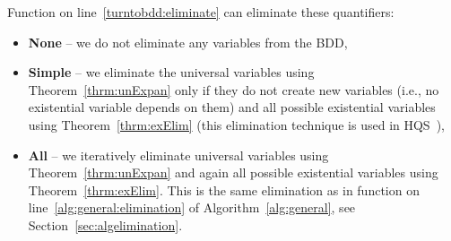 \documentclass[
  digital, %
  color,
  twoside, %
  table,   %
  nolof,     %
  nolot,     %
]{fithesis3}
\theoremstyle{definition}
\theoremstyle{remark}
\newcommand{\QEnone}{\textbf{None}}
\newcommand{\QEsimple}{\textbf{Simple}}
\newcommand{\QEall}{\textbf{All}}
\begin{document}
Function  on line~\ref{turntobdd:eliminate} can eliminate these quantifiers:
\begin{itemize}
    \item \QEnone{} -- we do not eliminate any variables from the BDD,
    \item \QEsimple{} -- we eliminate the universal variables using Theorem~\ref{thrm:unExpan} only if they do not create new variables (i.e., no existential variable depends on them) and all possible existential variables using Theorem~\ref{thrm:exElim} (this elimination technique is used in HQS~\cite{HQSquantifierLocalisation}), %
    \item \QEall{} -- we iteratively eliminate universal variables using Theorem~\ref{thrm:unExpan} and again all possible existential variables using Theorem~\ref{thrm:exElim}. This is the same elimination as in function  on line~\ref{alg:general:elimination} of Algorithm~\ref{alg:general}, see Section~\ref{sec:algelimination}. %
\end{itemize}
\end{document}
